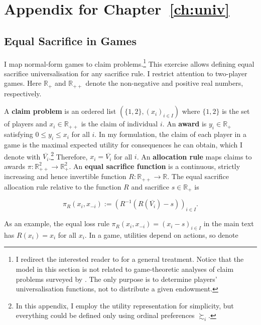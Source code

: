 \chapter{Appendix for Chapter \ref{ch:univ}}
\label{app:univ}

\section{Equal Sacrifice in Games}\label{sec:es}

I map normal-form games to claim problems.\footnote{I redirect the interested reader to \cite{thomsonHowDivideWhen2019} for a general treatment. Notice that the model in this section is not related to game-theoretic analyses of claim problems surveyed by \cite{thomsonGametheoreticAnalysisBankruptcy2013}. The only purpose is to determine players' universalisation functions, not to distribute a given endowment.} This exercise allows defining equal sacrifice universalisation for any sacrifice rule. I restrict attention to two-player games. Here \( \mathbb{R}_{+} \) and \( \mathbb{R}_{++} \) denote the non-negative and positive real numbers, respectively.

A \textbf{claim problem} is an ordered list \( \left( \{1, 2 \} , ( x_i )_{i \in I} \right) \) where \( \{1, 2 \} \) is the set of players and \( x_i \in \mathbb{R}_{++} \) is the claim of individual \( i \). An \textbf{award} is \( y_i \in \mathbb{R}_{+}\) satisfying \( 0 \leq y_i \leq x_i \) for all \( i \). In my formulation, the claim of each player in a game is the maximal expected utility for consequences he can obtain, which I denote with \( \overline{V_i} \).\footnote{In this appendix, I employ the utility representation for simplicity, but everything could be defined only using ordinal preferences \( \succsim_i \).} Therefore, \( x_i = \overline{V_i} \) for all \( i \). An \textbf{allocation rule} maps claims to awards \( \pi : \mathbb{R}_{++}^2 \rightarrow \mathbb{R}_{+}^2 \). An \textbf{equal sacrifice function} is a continuous, strictly increasing and hence invertible function \( R: \mathbb{R}_{++} \rightarrow \mathbb{R}\). The equal sacrifice allocation rule relative to the function \( R \) and sacrifice \( s \in \mathbb{R_{+}} \) is

\[
	\pi_{R} \left( x_i, x_{-i} \right) := \left( R^{-1} \left( R \left( \overline{V_i} \right) - s \right) \right)_{i \in I} .
\]

As an example, the equal loss rule \( \pi_R \left( x_i, x_{-i} \right) = \left( x_i - s \right)_{i \in I} \) in the main text has \( R\left(x_i \right) = x_i \) for all \( x_i \). In a game, utilities depend on actions, so denote

